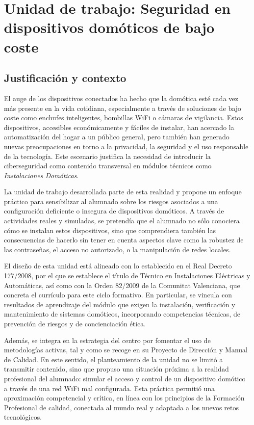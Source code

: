 \chapter{Unidad de trabajo: Seguridad en dispositivos domóticos de bajo coste}


\section{Justificación y contexto}
El auge de los dispositivos conectados ha hecho que la domótica esté cada vez más presente en la vida cotidiana, especialmente a través de soluciones de bajo coste como enchufes inteligentes, bombillas WiFi o cámaras de vigilancia. Estos dispositivos, accesibles económicamente y fáciles de instalar, han acercado la automatización del hogar a un público general, pero también han generado nuevas preocupaciones en torno a la privacidad, la seguridad y el uso responsable de la tecnología. Este escenario justifica la necesidad de introducir la ciberseguridad como contenido transversal en módulos técnicos como \textit{Instalaciones Domóticas}.

La unidad de trabajo desarrollada parte de esta realidad y propone un enfoque práctico para sensibilizar al alumnado sobre los riesgos asociados a una configuración deficiente o insegura de dispositivos domóticos. A través de actividades reales y simuladas, se pretendía que el alumnado no sólo conociera cómo se instalan estos dispositivos, sino que comprendiera también las consecuencias de hacerlo sin tener en cuenta aspectos clave como la robustez de las contraseñas, el acceso no autorizado, o la manipulación de redes locales.

El diseño de esta unidad está alineado con lo establecido en el Real Decreto 177/2008, por el que se establece el título de Técnico en Instalaciones Eléctricas y Automáticas, así como con la Orden 82/2009 de la Comunitat Valenciana, que concreta el currículo para este ciclo formativo. En particular, se vincula con resultados de aprendizaje del módulo que exigen la instalación, verificación y mantenimiento de sistemas domóticos, incorporando competencias técnicas, de prevención de riesgos y de concienciación ética.

Además, se integra en la estrategia del centro por fomentar el uso de metodologías activas, tal y como se recoge en su Proyecto de Dirección y Manual de Calidad. En este sentido, el planteamiento de la unidad no se limitó a transmitir contenido, sino que propuso una situación próxima a la realidad profesional del alumnado: simular el acceso y control de un dispositivo domótico a través de una red WiFi mal configurada. Esta práctica permitió una aproximación competencial y crítica, en línea con los principios de la Formación Profesional de calidad, conectada al mundo real y adaptada a los nuevos retos tecnológicos.

